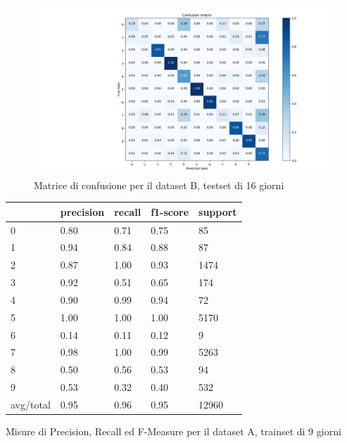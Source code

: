 \documentclass[10pt,a4paper]{article}
\begin{document}
	\begin{figure}[!htbp]
	\includegraphics[width=\linewidth]{immagini/confusion_matrix/b_16d.png}
	\caption{Matrice di confusione per il dataset B, testset di 16 giorni}
	\label{fig:b_16d}
	\end{figure}


	\begin{table}[!htbp]
    \scriptsize
    \centering
    	\begin{tabularx}{0.56\textwidth}{l | llll}
    		{} & {precision} & {recall} & {f1-score} & {support} \\
    		\midrule
            {0} & {0.80} & {0.71} & {0.75} & {85} \\
            {1} & {0.94} & {0.84} & {0.88} & {87} \\
            {2} & {0.87} & {1.00} & {0.93} & {1474} \\
            {3} & {0.92} & {0.51} & {0.65} & {174} \\
            {4} & {0.90} & {0.99} & {0.94} & {72} \\
            {5} & {1.00} & {1.00} & {1.00} & {5170} \\
            {6} & {0.14} & {0.11} & {0.12} & {9} \\
            {7} & {0.98} & {1.00} & {0.99} & {5263} \\
            {8} & {0.50} & {0.56} & {0.53} & {94} \\
            {9} & {0.53} & {0.32} & {0.40} & {532} \\
            {avg/total} & {0.95} & {0.96} & {0.95} & {12960} \\
    	\end{tabularx}
    	 {Misure di Precision, Recall ed F-Measure per il dataset A, trainset di 9 giorni}
    	\label{tab:a_9d}
    \end{table}
\end{document}
